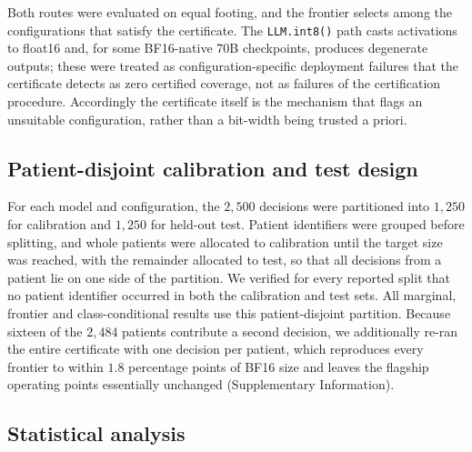 \documentclass[pdflatex,sn-mathphys-num]{sn-jnl}%
\theoremstyle{thmstyleone}%
\theoremstyle{thmstyletwo}%
\theoremstyle{thmstylethree}%
\begin{document}
Both routes were evaluated on equal footing, and the frontier selects among the configurations that
satisfy the certificate. The \texttt{LLM.int8()} path casts activations to float16 and, for some
BF16-native 70B checkpoints, produces degenerate outputs; these were treated as
configuration-specific deployment failures that the certificate detects as zero certified coverage,
not as failures of the certification procedure. Accordingly the certificate itself is the mechanism
that flags an unsuitable configuration, rather than a bit-width being trusted a priori.
 
\subsection*{Patient-disjoint calibration and test design}
 
For each model and configuration, the $2{,}500$ decisions were partitioned into $1{,}250$ for
calibration and $1{,}250$ for held-out test. Patient identifiers were grouped before splitting, and
whole patients were allocated to calibration until the target size was reached, with the remainder
allocated to test, so that all decisions from a patient lie on one side of the partition. We
verified for every reported split that no patient identifier occurred in both the calibration and
test sets. All marginal, frontier and class-conditional results use this patient-disjoint partition.
Because sixteen of the $2{,}484$ patients contribute a second decision, we additionally re-ran the
entire certificate with one decision per patient, which reproduces every frontier to within
$1.8$ percentage points of BF16 size and leaves the flagship operating points essentially unchanged
(Supplementary Information).
 
\subsection*{Statistical analysis}
 
\end{document}
